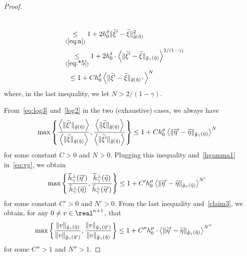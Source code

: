 \documentclass[10pt]{amsart}
\theoremstyle{definition}\newtheorem{defi}[theo]{Definition}\newtheorem{rema}[theo]{Remark}\newtheorem{exam}[theo]{Example}\newtheorem{exem}[theo]{Example}\newtheorem{nota}[theo]{Notation}
\newcommand*\ineq[1]{\underset{(#1)}{\leq}}
\let\oldtilde\tilde
\renewcommand*{\tilde}[1]{\mathchoice{\widetilde{#1}}{\widetilde{#1}}{\oldtilde{#1}}{\oldtilde{#1}}}
\begin{document}
\begin{proof}
\begin{enumerate}
\begin{equation}
\begin{split}
\\
& \ineq{\ref{eq:a}}1+2h_{0}^{\delta}\|\tilde{\xi}'-\tilde{\xi}\|_{\tilde{g}\left(\tilde{\eta}\right)}^{2}\\
& \ineq{\ref{eq:*5}}1+2h_{0}^{\delta}\cdot\left\langle\|\tilde{\xi}'-\tilde{\xi}\|_{\tilde{g}_{\gamma}\left(\tilde{\eta}\right)}\right\rangle^{2/(1-\gamma)}\\
& \mkern13mu\le1+Ch_{0}^{\delta}\left\langle\|\tilde{\xi}'-\tilde{\xi}\|_{\tilde{g}\left(\tilde{\eta}\right)^{\gamma}}\right\rangle^{N}
\end{split}
\end{equation}
where, in the last inequality, we let $N>2/(1-\gamma)$.
\end{enumerate}
From~\eqref{eq:log3} and~\eqref{log2} in the two (exhaustive) cases, we always have
\[
\max\left\{ \frac{\left\langle\|\tilde{\xi}'\|_{\tilde{g}\left(\tilde{\eta}\right)}\right\rangle}{\left\langle\|\tilde{\xi}\|_{\tilde{g}\left(\tilde{\eta}\right)}\right\rangle},\frac{\left\langle\|\tilde{\xi}\|_{\tilde{g}\left(\tilde{\eta}\right)}\right\rangle}{\left\langle\|\tilde{\xi}'\|_{\tilde{g}\left(\tilde{\eta}\right)}\right\rangle}\right\} \le1+Ch_{0}^{\mu}\left\langle \|\tilde{\eta}'-\tilde{\eta}\|_{\tilde{g}_{\gamma}\left(\tilde{\eta}\right)}\right\rangle ^{N}
\]
for some constant $C>0$ and $N>0$. Plugging this inequality and~\eqref{hgamma1} in~\eqref{eq:vg}, we obtain
\[
\max\left\{ \frac{\tilde{h}_{\gamma}^{\perp}(\tilde{\eta}')}{\tilde{h}_{\gamma}^{\perp}(\tilde{\eta})},\frac{\tilde{h}_{\gamma}^{\perp}(\tilde{\eta})}{\tilde{h}_{\gamma}^{\perp}(\tilde{\eta}')}\right\} \le1+C'h_{0}^{\mu}\left\langle \|\tilde{\eta}'-\tilde{\eta}\|_{\tilde{g}_{\gamma}\left(\tilde{\eta}\right)}\right\rangle ^{N'}
\]
for some constant $C'>0$ and $N'>0$. From the last inequality and~\eqref{claim3}, we obtain, for any $0\neq v\in\real^{n+1}$, that
\begin{align}
\max\left\{ \frac{\|v\|_{\tilde{g}_{\gamma}\left(\tilde{\eta}\right)}}{\|v\|_{\tilde{g}_{\gamma}\left(\tilde{\eta}'\right)}},\frac{\|v\|_{\tilde{g}_{\gamma}\left(\tilde{\eta}'\right)}}{\|v\|_{\tilde{g}_{\gamma}\left(\tilde{\eta}\right)}}\right\} & \le1+C''h_{0}^{\mu}\cdot\left\langle \|\tilde{\eta}'-\tilde{\eta}\|_{\tilde{g}_{\gamma}\left(\tilde{\eta}\right)}\right\rangle ^{N''}\label{claim4}
\end{align}
for some $C''>1$ and $N''>1$.


\end{proof}
\end{document}
